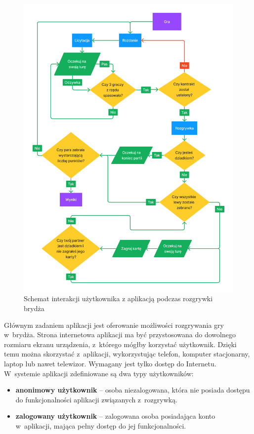\begin{figure}[p!]
  \centering
  \includegraphics[width=\textwidth]{img/flow-aplikacji/game_flow.png}
  \caption{Schemat interakcji użytkownika z aplikacją podczas rozgrywki brydża}
\end{figure}

Głównym zadaniem aplikacji jest oferowanie możliwości
rozgrywania gry w~brydża. Strona internetowa aplikacji ma być
przystosowana do dowolnego rozmiaru ekranu urządzenia, z~którego mógłby
korzystać użytkownik. Dzięki temu można skorzystać z~aplikacji, wykorzystując
telefon, komputer stacjonarny, laptop lub nawet telewizor. Wymagany
jest tylko dostęp do Internetu. \\


W~systemie aplikacji zdefiniowane są dwa typy użytkowników:
\begin{itemize}
  \item \textbf{anonimowy użytkownik} -- osoba niezalogowana, która nie
        posiada dostępu do funkcjonalności aplikacji związanych
        z~rozgrywką.

  \item \textbf{zalogowany użytkownik} -- zalogowana osoba posiadająca konto
        w~aplikacji, mająca pełny dostęp do jej funkcjonalności.
\end{itemize}

